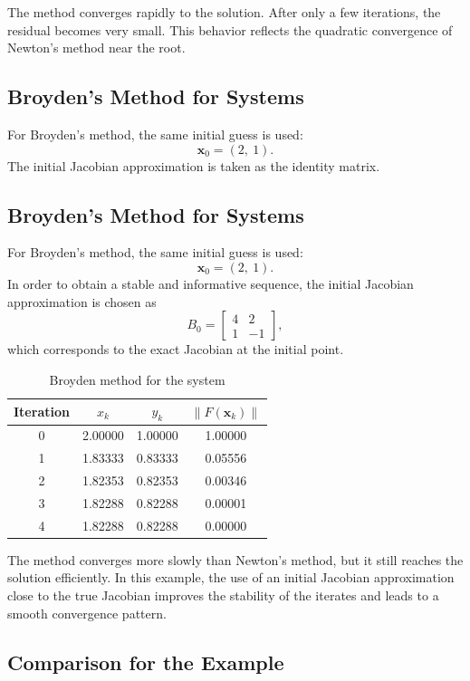 The method converges rapidly to the solution. After only a few iterations, the residual becomes very small. This behavior reflects the quadratic convergence of Newton's method near the root.

\subsection{Broyden's Method for Systems}

For Broyden's method, the same initial guess is used:
\[
\mathbf{x}_0 = (2,\ 1).
\]
The initial Jacobian approximation is taken as the identity matrix.

\subsection{Broyden's Method for Systems}

For Broyden's method, the same initial guess is used:
\[
\mathbf{x}_0 = (2,\ 1).
\]
In order to obtain a stable and informative sequence, the initial Jacobian approximation is chosen as
\[
B_0 =
\begin{bmatrix}
4 & 2 \\
1 & -1
\end{bmatrix},
\]
which corresponds to the exact Jacobian at the initial point.

\begin{table}[h!]
\centering
\caption{Broyden method for the system}
\label{tab:broyden_example}
\begin{tabular}{|c|c|c|c|}
\hline
Iteration & \(x_k\) & \(y_k\) & \(\|F(\mathbf{x}_k)\|\) \\ \hline
0 & 2.00000 & 1.00000 & 1.00000 \\ \hline
1 & 1.83333 & 0.83333 & 0.05556 \\ \hline
2 & 1.82353 & 0.82353 & 0.00346 \\ \hline
3 & 1.82288 & 0.82288 & 0.00001 \\ \hline
4 & 1.82288 & 0.82288 & 0.00000 \\ \hline
\end{tabular}
\end{table}

The method converges more slowly than Newton's method, but it still reaches the solution efficiently. In this example, the use of an initial Jacobian approximation close to the true Jacobian improves the stability of the iterates and leads to a smooth convergence pattern.

\subsection{Comparison for the Example}

